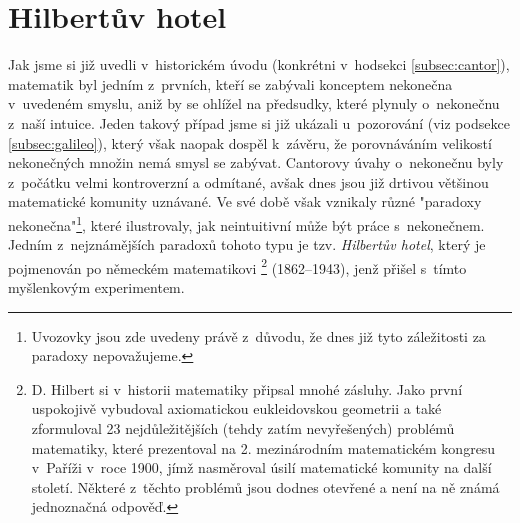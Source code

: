 \section{Hilbertův hotel}\label{sec:hilbertuv_hotel}
Jak jsme si již uvedli v~historickém úvodu (konkrétni v~hodsekci \ref{subsec:cantor}), matematik  byl jedním z~prvních, kteří se zabývali konceptem nekonečna v~uvedeném smyslu, aniž by se ohlížel na předsudky, které plynuly o~nekonečnu z~naší intuice. Jeden takový případ jsme si již ukázali u~pozorování  (viz podsekce \ref{subsec:galileo}), který však naopak dospěl k~závěru, že porovnáváním velikostí nekonečných množin nemá smysl se zabývat. Cantorovy úvahy o~nekonečnu byly z~počátku velmi kontroverzní a odmítané, avšak dnes jsou již drtivou většinou matematické komunity uznávané. Ve své době však vznikaly různé "paradoxy nekonečna"\footnote{Uvozovky jsou zde uvedeny právě z~důvodu, že dnes již tyto záležitosti za paradoxy nepovažujeme.}, které ilustrovaly, jak neintuitivní může být práce s~nekonečnem. Jedním z~nejznámějších paradoxů tohoto typu je tzv. \emph{Hilbertův hotel}, který je pojmenován po německém matematikovi \footnote{D. Hilbert si v~historii matematiky připsal mnohé zásluhy. Jako první uspokojivě vybudoval axiomatickou eukleidovskou geometrii a také zformuloval 23 nejdůležitějších (tehdy zatím nevyřešených) problémů matematiky, které prezentoval na 2. mezinárodním matematickém kongresu v~Paříži v~roce 1900, jímž nasměroval úsilí matematické komunity na další století. Některé z~těchto problémů jsou dodnes otevřené a není na ně známá jednoznačná odpověď.} (1862--1943), jenž přišel s~tímto myšlenkovým experimentem.
\medskip

